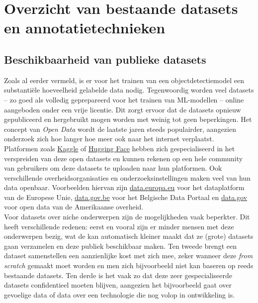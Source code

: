 \section{Overzicht van bestaande datasets en annotatietechnieken}


\subsection{Beschikbaarheid van publieke datasets}

Zoals al eerder vermeld, is er voor het trainen van een objectdetectiemodel een substantiële hoeveelheid gelabelde data nodig. Tegenwoordig worden veel datasets -- zo goed als volledig geprepareerd voor het trainen van ML-modellen -- online aangeboden onder een vrije licentie. Dit zorgt ervoor dat de datasets opnieuw gepubliceerd en hergebruikt mogen worden met weinig tot geen beperkingen. Het concept van \emph{Open Data} wordt de laatste jaren steeds populairder, aangezien onderzoek zich hoe langer hoe meer ook naar het internet verplaatst. \autocite{Murray_Rust_2008} \\

Platformen zoals \href{https://www.kaggle.com/datasets}{Kaggle} of \href{https://huggingface.co/datasets}{Hugging Face} hebben zich gespecialiseerd in het verspreiden van deze open datasets en kunnen rekenen op een hele community van gebruikers om deze datasets te uploaden naar hun platformen. Ook verschillende overheidsorganisaties en onderzoeksinstellingen maken veel van hun data openbaar. Voorbeelden hiervan zijn \href{https://data.europa.eu/}{data.europa.eu} voor het dataplatform van de Europese Unie, \href{https://data.gov.be/nl}{data.gov.be} voor het Belgische Data Portaal en \href{https://data.gov/}{data.gov} voor open data van de Amerikaanse overheid. \\

Voor datasets over niche onderwerpen zijn de mogelijkheden vaak beperkter. Dit heeft verschillende redenen: eerst en vooral zijn er minder mensen met deze onderwerpen bezig, wat de kan automatisch kleiner maakt dat ze (grote) datasets gaan verzamelen en deze publiek beschikbaar maken. Ten tweede brengt een dataset samenstellen een aanzienlijke kost met zich mee, zeker wanneer deze \textit{from scratch} gemaakt moet worden en men zich bijvoorbeeld niet kan baseren op reeds bestaande datasets. Ten derde is het vaak zo dat deze zeer gespecialiseerde datasets confidentieel moeten blijven, aangezien het bijvoorbeeld gaat over gevoelige data of data over een technologie die nog volop in ontwikkeling is.


